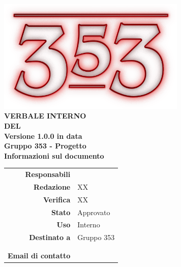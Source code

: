 \documentclass[openany, a4paper, 12pt]{report}
\begin{document}
\begin{titlepage}
	\centering
	\vfill
	{
		\bfseries
		\vskip2cm
		\includegraphics[width=9cm]{../../common/images/logo.png} \\
		\vfill
		\Huge{VERBALE INTERNO\\DEL {}}\\
		\vfill
		\Large Versione 1.0.0 in data \\
		\large Gruppo 353 - Progetto \progetto \\
		\vfill
		\normalsize Informazioni sul documento\\
		\begin{table}[htbp]
			\centering
			\renewcommand\arraystretch{1.2}
			\begin{tabular}{r|l}
				\hline
				\textbf{Responsabili}	& \Davide \\
				
				\textbf{Redazione} 		& XX \\
				\textbf{Verifica} 		& XX \\	
				
				\textbf{Stato} 			& Approvato\\
				\textbf{Uso}			& Interno\\
				\textbf{Destinato a}   	& Gruppo 353\\
										& \Vardanega\\
										& \Cardin\\
				
				\textbf{Email di contatto}	& \mailgroup
			\end{tabular}
		\end{table}
		\vfill 
	}    
\end{titlepage}


 
\end{document}
